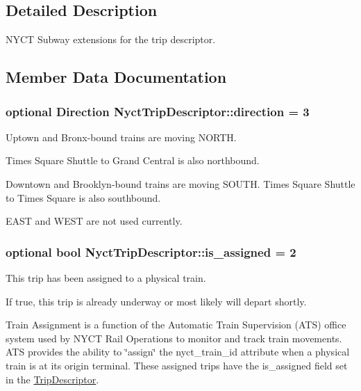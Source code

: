 \subsection{Detailed Description}
N\+Y\+CT Subway extensions for the trip descriptor. 

\subsection{Member Data Documentation}
\subsubsection[{\texorpdfstring{direction}{direction}}]{\setlength{\rightskip}{0pt plus 5cm}optional {\bf Direction} Nyct\+Trip\+Descriptor\+::direction = 3}\hypertarget{structNyctTripDescriptor_a0803947324a7c58b27475e1f57fbbb46}{}\label{structNyctTripDescriptor_a0803947324a7c58b27475e1f57fbbb46}


Uptown and Bronx-\/bound trains are moving N\+O\+R\+TH. 

Times Square Shuttle to Grand Central is also northbound.

Downtown and Brooklyn-\/bound trains are moving S\+O\+U\+TH. Times Square Shuttle to Times Square is also southbound.

E\+A\+ST and W\+E\+ST are not used currently. 
\subsubsection[{\texorpdfstring{is\+\_\+assigned}{is_assigned}}]{\setlength{\rightskip}{0pt plus 5cm}optional bool Nyct\+Trip\+Descriptor\+::is\+\_\+assigned = 2}\hypertarget{structNyctTripDescriptor_aeb67c25d340de4442fe41d5cfe4b6005}{}\label{structNyctTripDescriptor_aeb67c25d340de4442fe41d5cfe4b6005}


This trip has been assigned to a physical train. 

If true, this trip is already underway or most likely will depart shortly.

Train Assignment is a function of the Automatic Train Supervision (A\+TS) office system used by N\+Y\+CT Rail Operations to monitor and track train movements. A\+TS provides the ability to \char`\"{}assign\char`\"{} the nyct\+\_\+train\+\_\+id attribute when a physical train is at its origin terminal. These assigned trips have the is\+\_\+assigned field set in the \hyperlink{structTripDescriptor}{Trip\+Descriptor}.

